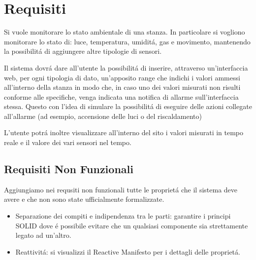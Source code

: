 \section{Requisiti}

Si vuole monitorare lo stato ambientale di una stanza. In particolare si vogliono monitorare lo stato di: luce, temperatura, umidit\'a, gas e movimento, mantenendo la possibilit\'a di aggiungere altre tipologie di sensori.

Il sistema dovr\'a dare all'utente la possibilit\'a di inserire, attraverso un'interfaccia web, per ogni tipologia di dato, un'apposito range che indichi i valori ammessi all'interno della stanza in modo che, in caso uno dei valori misurati non risulti conforme alle specifiche, venga indicata una notifica di allarme sull'interfaccia stessa. Questo con l'idea di simulare la possibilit\'a di eseguire delle azioni collegate all'allarme (ad esempio, accensione delle luci o del riscaldamento)

L'utente potr\'a inoltre visualizzare all'interno del sito i valori misurati in tempo reale e il valore dei vari sensori nel tempo.

\subsection{Requisiti Non Funzionali}

Aggiungiamo nei requsiti non funzionali tutte le propriet\'a che il sistema deve avere e che non sono state ufficialmente formalizzate.

\begin{itemize}
  \item Separazione dei compiti e indipendenza tra le parti: garantire i principi SOLID dove \'e possibile evitare che un qualsiasi componente sia strettamente legato ad un'altro.
  \item Reattivit\'a: si visualizzi il Reactive Manifesto per i dettagli delle propriet\'a.
\end{itemize}
